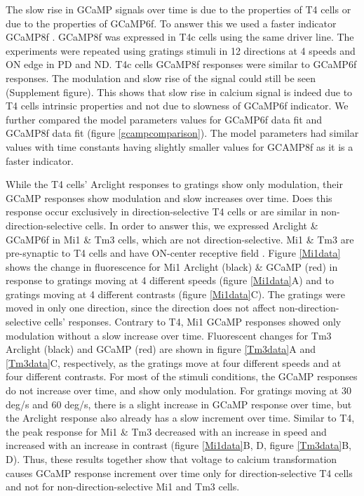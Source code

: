 \documentclass[9pt,lineno]{elife}
\begin{document}
The slow rise in GCaMP signals over time is due to the properties of T4 cells or due to the properties of GCaMP6f. To answer this we used a faster indicator GCaMP8f \parencite{Zhang2020}. GCaMP8f was expressed in T4c cells using the same driver line. The experiments were repeated using gratings stimuli in 12 directions at 4 speeds and ON edge in PD and ND. T4c cells GCaMP8f responses were similar to GCaMP6f responses. The modulation and slow rise of the signal could still be seen (Supplement figure). This shows that slow rise in calcium signal is indeed due to T4 cells intrinsic properties and not due to slowness of GCaMP6f indicator. We further compared the model parameters values for GCaMP6f data fit and GCaMP8f data fit (figure \ref{gcampcomparison}). The model parameters had similar values with time constants having slightly smaller values for GCAMP8f as it is a faster indicator.

While the T4 cells' Arclight responses to gratings show only modulation, their GCaMP responses show modulation and slow increases over time. Does this response occur exclusively in direction-selective T4 cells or are similar in non-direction-selective cells. In order to answer this, we expressed Arclight \& GCaMP6f in Mi1 \& Tm3 cells, which are not direction-selective. Mi1 \& Tm3 are pre-synaptic to T4 cells and have ON-center receptive field \parencite{Takemura2017, Arenz2017}. Figure \ref{Mi1data} shows the change in fluorescence for Mi1 Arclight (black) \& GCaMP (red) in response to gratings moving at 4 different speeds (figure \ref{Mi1data}A) and to gratings moving at 4 different contrasts (figure \ref{Mi1data}C). The gratings were moved in only one direction, since the direction does not affect non-direction-selective cells' responses. Contrary to T4, Mi1 GCaMP responses showed only modulation without a slow increase over time. Fluorescent changes for Tm3 Arclight (black) and GCaMP (red) are shown in figure \ref{Tm3data}A and \ref{Tm3data}C, respectively, as the gratings move at four different speeds and at four different contrasts. For most of the stimuli conditions, the GCaMP responses do not increase over time, and show only modulation. For gratings moving at 30 deg/s and 60 deg/s, there is a slight increase in GCaMP response over time, but the Arclight response also already has a slow increment over time. Similar to T4, the peak response for Mi1 \& Tm3 decreased with an increase in speed and increased with an increase in contrast (figure \ref{Mi1data}B, D, figure \ref{Tm3data}B, D). Thus, these results together show that voltage to calcium transformation causes GCaMP response increment over time only for direction-selective T4 cells and not for non-direction-selective Mi1 and Tm3 cells.
\end{document}
